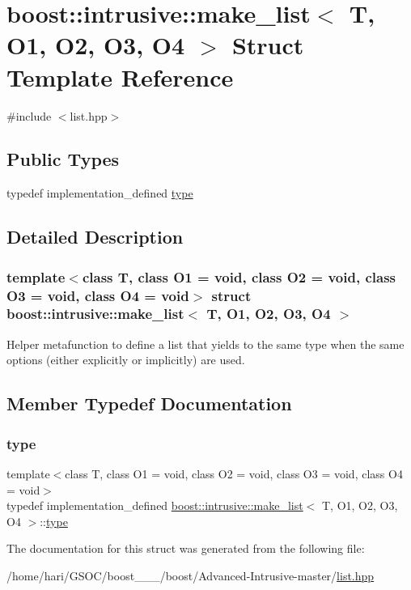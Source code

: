 \hypertarget{structboost_1_1intrusive_1_1make__list}{}\section{boost\+:\+:intrusive\+:\+:make\+\_\+list$<$ T, O1, O2, O3, O4 $>$ Struct Template Reference}
\label{structboost_1_1intrusive_1_1make__list}


{\ttfamily \#include $<$list.\+hpp$>$}

\subsection*{Public Types}
\begin{DoxyCompactItemize}
\item 
typedef implementation\+\_\+defined \hyperlink{structboost_1_1intrusive_1_1make__list_a952a8b553ca84125fc1e7c56d5c141b4}{type}
\end{DoxyCompactItemize}


\subsection{Detailed Description}
\subsubsection*{template$<$class T, class O1 = void, class O2 = void, class O3 = void, class O4 = void$>$\newline
struct boost\+::intrusive\+::make\+\_\+list$<$ T, O1, O2, O3, O4 $>$}

Helper metafunction to define a {\ttfamily list} that yields to the same type when the same options (either explicitly or implicitly) are used. 

\subsection{Member Typedef Documentation}
\mbox{\label{structboost_1_1intrusive_1_1make__list_a952a8b553ca84125fc1e7c56d5c141b4}} 
\subsubsection{\texorpdfstring{type}{type}}
{\footnotesize\ttfamily template$<$class T, class O1 = void, class O2 = void, class O3 = void, class O4 = void$>$ \\
typedef implementation\+\_\+defined \hyperlink{structboost_1_1intrusive_1_1make__list}{boost\+::intrusive\+::make\+\_\+list}$<$ T, O1, O2, O3, O4 $>$\+::\hyperlink{structboost_1_1intrusive_1_1make__list_a952a8b553ca84125fc1e7c56d5c141b4}{type}}



The documentation for this struct was generated from the following file\+:\begin{DoxyCompactItemize}
\item 
/home/hari/\+G\+S\+O\+C/boost\+\_\+\_\+\_/boost/\+Advanced-\/\+Intrusive-\/master/\hyperlink{list_8hpp}{list.\+hpp}\end{DoxyCompactItemize}
